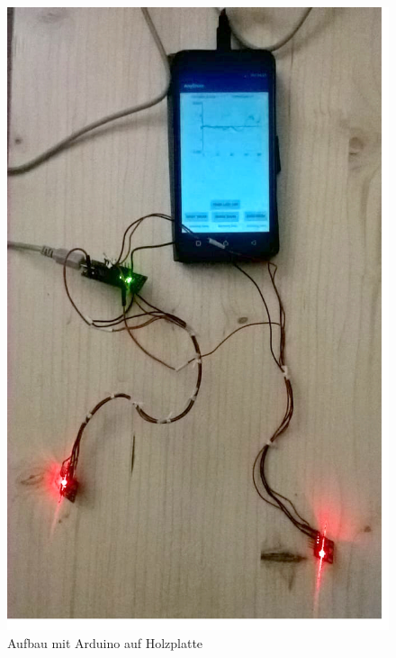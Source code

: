 \begin{figure}[H]
	\centering
	\includegraphics[scale=0.25]{figures/aufbau.jpg}
	\caption{Aufbau mit Arduino auf Holzplatte}
	\label{fig:app}
\end{figure}


